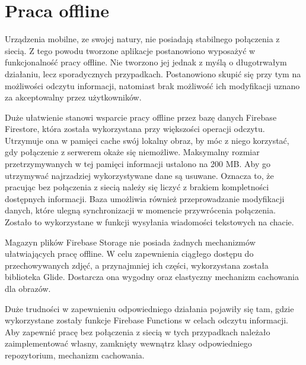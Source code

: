 \section{Praca offline}

Urządzenia mobilne, ze swojej natury, nie posiadają stabilnego połączenia z siecią. Z tego powodu tworzone aplikacje postanowiono wyposażyć w funkcjonalność pracy offline. Nie tworzono jej jednak z myślą o długotrwałym działaniu, lecz sporadycznych przypadkach. Postanowiono skupić się przy tym na możliwości odczytu informacji, natomiast brak możliwość ich modyfikacji uznano za akceptowalny przez użytkowników.

Duże ułatwienie stanowi wsparcie pracy offline przez bazę danych Firebase Firestore, która została wykorzystana przy większości operacji odczytu. Utrzymuje ona w pamięci cache swój lokalny obraz, by móc z niego korzystać, gdy połączenie z serwerem okaże się niemożliwe. Maksymalny rozmiar przetrzymywanych w tej pamięci informacji ustalono na 200 MB. Aby go utrzymywać najrzadziej wykorzystywane dane są usuwane. Oznacza to, że pracując bez połączenia z siecią należy się liczyć z brakiem kompletności dostępnych informacji. Baza umożliwia również przeprowadzanie modyfikacji danych, które ulegną synchronizacji w momencie przywrócenia połączenia. Zostało to wykorzystane w funkcji wysyłania wiadomości tekstowych na chacie.


Magazyn plików Firebase Storage nie posiada żadnych mechanizmów ułatwiających pracę offline. W celu zapewnienia ciągłego dostępu do przechowywanych zdjęć, a przynajmniej ich części, wykorzystana została biblioteka Glide. Dostarcza ona wygodny oraz elastyczny mechanizm cachowania dla obrazów.

Duże trudności w zapewnieniu odpowiedniego działania pojawiły się tam, gdzie wykorzystane zostały funkcje Firebase Functions w celach odczytu informacji. Aby zapewnić pracę bez połączenia z siecią w tych przypadkach należało zaimplementować własny, zamknięty wewnątrz klasy odpowiedniego repozytorium, mechanizm cachowania.
